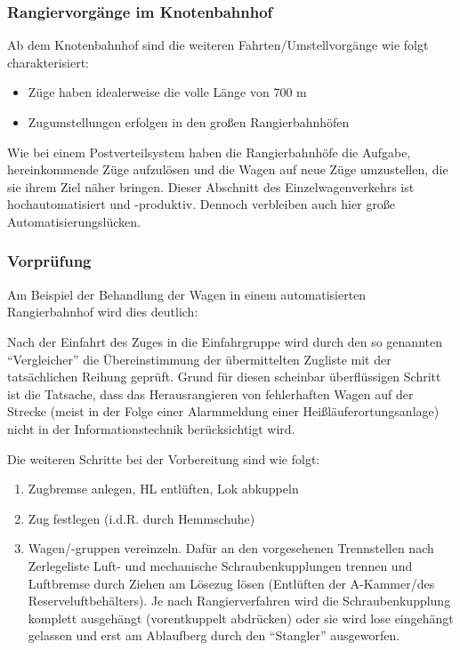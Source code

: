 \subsubsection{Rangiervorgänge im Knotenbahnhof}\label{sec:RangKnoten}
Ab dem \gls{Knotenbahnhof} sind die weiteren Fahrten/Umstellvorgänge wie folgt charakterisiert:
\begin{itemize}
    \item Züge haben idealerweise die volle Länge von 700 m
    \item Zugumstellungen erfolgen in den großen Rangierbahnhöfen
\end{itemize}
Wie bei einem Postverteilsystem haben die Rangierbahnhöfe die Aufgabe, hereinkommende Züge aufzulösen und die Wagen auf neue Züge umzustellen, die sie ihrem Ziel näher bringen. Dieser Abschnitt des Einzelwagenverkehrs ist hochautomatisiert und -produktiv. Dennoch verbleiben auch hier große Automatisierungslücken. 
\subsubsection{Vorprüfung}\label{sec:Vorpruefung}
Am Beispiel der Behandlung der Wagen in einem automatisierten \gls{Rangierbahnhof} wird dies deutlich:\par
Nach der Einfahrt des Zuges in die Einfahrgruppe wird durch den so genannten "`Vergleicher"' die Übereinstimmung der übermittelten Zugliste mit der tatsächlichen Reihung geprüft. Grund für diesen scheinbar überflüssigen Schritt ist die Tatsache, dass das Herausrangieren von fehlerhaften Wagen auf der Strecke (meist in der Folge einer Alarmmeldung einer Heißläuferortungsanlage) nicht in der Informationstechnik berücksichtigt wird.\par
Die weiteren Schritte bei der Vorbereitung sind wie folgt:
\begin{enumerate}
    \item Zugbremse anlegen, \acrshort{HL} entlüften, Lok abkuppeln
    \item Zug festlegen (i.d.R. durch \gls{Hemmschuh}e)
    \item Wagen/-gruppen vereinzeln. Dafür an den vorgesehenen Trennstellen nach Zerlegeliste Luft- und mechanische Schraubenkupplungen trennen und Luftbremse durch Ziehen am Lösezug lösen (Entlüften der A-Kammer/des Reserveluftbehälters). Je nach Rangierverfahren wird die Schraubenkupplung komplett ausgehängt (vorentkuppelt abdrücken) oder sie wird lose eingehängt gelassen und erst am \gls{Ablaufberg} durch den "`Stangler"' ausgeworfen.
\end{enumerate}
